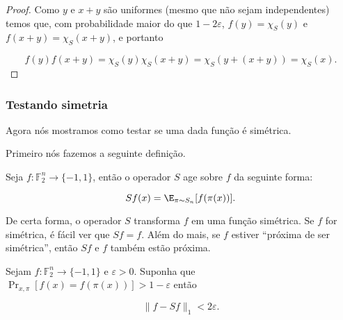 \begin{proof}

Como $y$ e $x + y$ são uniformes (mesmo que não sejam independentes) temos que, com probabilidade maior do que $1 - 2\varepsilon$, $f(y) = \chi_{S}(y)$ e $f(x + y) = \chi_{S}(x + y)$, e portanto

\begin{equation*}
	f(y)f(x + y) = \chi_{S}(y)\chi_{S}(x + y) = \chi_{S}(y + (x + y)) = \chi_{S}(x).
\end{equation*}

\end{proof}

\subsubsection{Testando simetria}

Agora nós mostramos como testar se uma dada função é simétrica.

Primeiro nós fazemos a seguinte definição.

\begin{defi}

Seja $f: \mathbb{F}_{2}^{n} \to \{-1, 1\}$, então o operador $S$ age sobre $f$ da seguinte forma:

\begin{equation*}
	Sf(x) = \E_{\pi \sim S_{n}}[f(\pi(x))].
\end{equation*}

\end{defi}

De certa forma, o operador $S$ transforma $f$ em uma função simétrica. Se $f$ for simétrica, é fácil ver que $Sf = f$. Além do mais, se $f$ estiver ``próxima de ser simétrica'', então $Sf$ e $f$ também estão próxima.

\begin{prop} \label{f_sf_1_norm}

Sejam $f: \mathbb{F}_{2}^{n} \to \{-1, 1\}$ e $\varepsilon > 0$. Suponha que $\Pr_{x, \pi}[f(x) = f(\pi(x))] > 1 - \varepsilon$ então

\begin{equation*}
	\lVert f - Sf \rVert_{1} < 2\varepsilon.
\end{equation*}

\end{prop}

